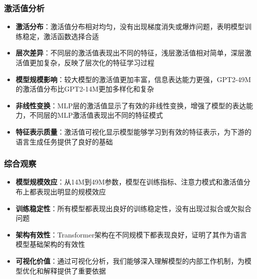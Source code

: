 \documentclass{article}
\begin{document}
\subsubsection{激活值分析}
\begin{itemize}
    \item \textbf{激活分布}：激活值分布相对均匀，没有出现梯度消失或爆炸问题，表明模型训练稳定，激活函数选择合适
    \item \textbf{层次差异}：不同层的激活值表现出不同的特征，浅层激活值相对简单，深层激活值更加复杂，反映了层次化的特征学习过程
    \item \textbf{模型规模影响}：较大模型的激活值更加丰富，信息表达能力更强，GPT2-49M的激活值分布比GPT2-14M更加多样化和复杂
    \item \textbf{非线性变换}：MLP层的激活值显示了有效的非线性变换，增强了模型的表达能力，不同层的MLP激活值表现出不同的特征模式
    \item \textbf{特征表示质量}：激活值可视化显示模型能够学习到有效的特征表示，为下游的语言生成任务提供了良好的基础
\end{itemize}

\subsubsection{综合观察}
\begin{itemize}
    \item \textbf{模型规模效应}：从14M到49M参数，模型在训练指标、注意力模式和激活值分布上都表现出明显的规模效应
    \item \textbf{训练稳定性}：所有模型都表现出良好的训练稳定性，没有出现过拟合或欠拟合问题
    \item \textbf{架构有效性}：Transformer架构在不同规模下都表现良好，证明了其作为语言模型基础架构的有效性
    \item \textbf{可视化价值}：通过可视化分析，我们能够深入理解模型的内部工作机制，为模型优化和解释提供了重要依据
\end{itemize}
\end{document}
